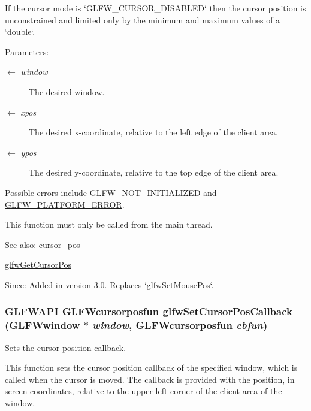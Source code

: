 If the cursor mode is `GLFW\_\-CURSOR\_\-DISABLED` then the cursor position is unconstrained and limited only by the minimum and maximum values of a `double`.

\begin{Desc}
\item[Parameters:]
\begin{description}
\item[\mbox{$\leftarrow$} {\em window}]The desired window. \item[\mbox{$\leftarrow$} {\em xpos}]The desired x-coordinate, relative to the left edge of the client area. \item[\mbox{$\leftarrow$} {\em ypos}]The desired y-coordinate, relative to the top edge of the client area.\end{description}
\end{Desc}
Possible errors include \hyperlink{group__errors_g2374ee02c177f12e1fa76ff3ed15e14a}{GLFW\_\-NOT\_\-INITIALIZED} and \hyperlink{group__errors_gd44162d78100ea5e87cdd38426b8c7a1}{GLFW\_\-PLATFORM\_\-ERROR}.

This function must only be called from the main thread.

\begin{Desc}
\item[See also:]cursor\_\-pos 

\hyperlink{group__input_gd289438eb7cf53d11eca685373f44105}{glfwGetCursorPos}\end{Desc}
\begin{Desc}
\item[Since:]Added in version 3.0. Replaces `glfwSetMousePos`. \end{Desc}
\hypertarget{group__input_g9c49c0d3d3c775c3124726f1d902124d}{
\subsubsection[glfwSetCursorPosCallback]{\setlength{\rightskip}{0pt plus 5cm}GLFWAPI {\bf GLFWcursorposfun} glfwSetCursorPosCallback ({\bf GLFWwindow} $\ast$ {\em window}, \/  {\bf GLFWcursorposfun} {\em cbfun})}}
\label{group__input_g9c49c0d3d3c775c3124726f1d902124d}


Sets the cursor position callback. 

This function sets the cursor position callback of the specified window, which is called when the cursor is moved. The callback is provided with the position, in screen coordinates, relative to the upper-left corner of the client area of the window.

